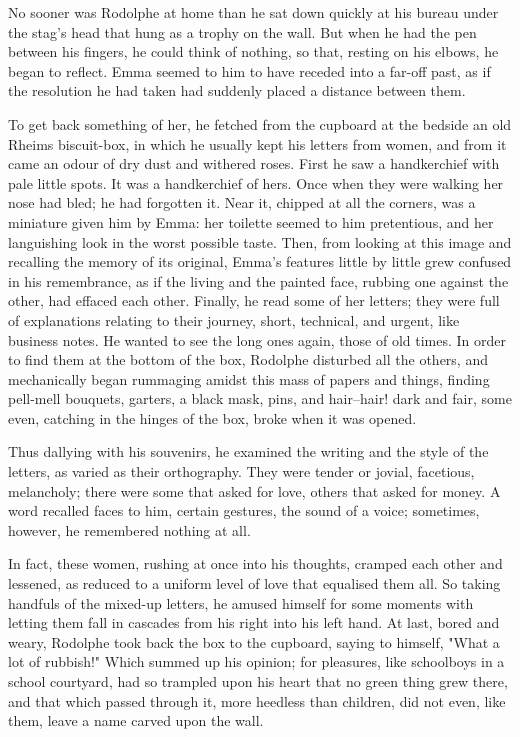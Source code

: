 \documentclass[11pt,twocolumn]{ltugboat}
\begin{document}
No sooner was Rodolphe at home than he sat down quickly at his bureau
under the stag's head that hung as a trophy on the wall. But when he had
the pen between his fingers, he could think of nothing, so that, resting
on his elbows, he began to reflect. Emma seemed to him to have receded
into a far-off past, as if the resolution he had taken had suddenly
placed a distance between them.

To get back something of her, he fetched from the cupboard at the
bedside an old Rheims biscuit-box, in which he usually kept his letters
from women, and from it came an odour of dry dust and withered
roses. First he saw a handkerchief with pale little spots. It was a
handkerchief of hers. Once when they were walking her nose had bled; he
had forgotten it. Near it, chipped at all the corners, was a miniature
given him by Emma: her toilette seemed to him pretentious, and her
languishing look in the worst possible taste. Then, from looking at this
image and recalling the memory of its original, Emma's features little
by little grew confused in his remembrance, as if the living and the
painted face, rubbing one against the other, had effaced each other.
Finally, he read some of her letters; they were full of explanations
relating to their journey, short, technical, and urgent, like business
notes. He wanted to see the long ones again, those of old times. In
order to find them at the bottom of the box, Rodolphe disturbed all the
others, and mechanically began rummaging amidst this mass of papers and
things, finding pell-mell bouquets, garters, a black mask, pins, and
hair--hair! dark and fair, some even, catching in the hinges of the box,
broke when it was opened.

Thus dallying with his souvenirs, he examined the writing and the style
of the letters, as varied as their orthography. They were tender or
jovial, facetious, melancholy; there were some that asked for love,
others that asked for money. A word recalled faces to him, certain
gestures, the sound of a voice; sometimes, however, he remembered
nothing at all.

In fact, these women, rushing at once into his thoughts, cramped each
other and lessened, as reduced to a uniform level of love that equalised
them all. So taking handfuls of the mixed-up letters, he amused himself
for some moments with letting them fall in cascades from his right into
his left hand. At last, bored and weary, Rodolphe took back the box to
the cupboard, saying to himself, "What a lot of rubbish!" Which summed
up his opinion; for pleasures, like schoolboys in a school courtyard,
had so trampled upon his heart that no green thing grew there, and that
which passed through it, more heedless than children, did not even, like
them, leave a name carved upon the wall.
\end{document}
